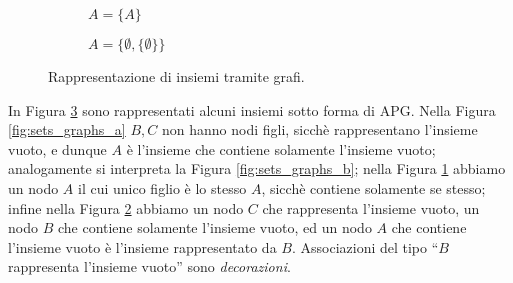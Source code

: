 \begin{example}
\begin{figure}[t]
\begin{subfigure}{.15\textwidth}
          \caption{$A = \{A\}$}
          \label{fig:sets_graphs_c}
        \end{subfigure}
        \begin{subfigure}{.25\textwidth}
            \centering
            \caption{$A = \{\emptyset, \{\emptyset\}\}$}
            \label{fig:sets_graphs_d}
          \end{subfigure}

        \caption{Rappresentazione di insiemi tramite grafi.}
        \label{fig:graph_set}
    \end{figure}
    In Figura \ref{fig:graph_set} sono rappresentati alcuni insiemi sotto forma di APG. Nella Figura \ref{fig:sets_graphs_a} $B,C$ non hanno nodi figli, sicchè rappresentano l'insieme vuoto, e dunque $A$ è l'insieme che contiene solamente l'insieme vuoto; analogamente si interpreta la Figura \ref{fig:sets_graphs_b}; nella Figura \ref{fig:sets_graphs_c} abbiamo un nodo $A$ il cui unico figlio è lo stesso $A$, sicchè contiene solamente se stesso; infine nella Figura \ref{fig:sets_graphs_d} abbiamo un nodo $C$ che rappresenta l'insieme vuoto, un nodo $B$ che contiene solamente l'insieme vuoto, ed un nodo $A$ che contiene l'insieme vuoto è l'insieme rappresentato da $B$. Associazioni del tipo ``$B$ rappresenta l'insieme vuoto'' sono \emph{decorazioni}.
\end{example}
